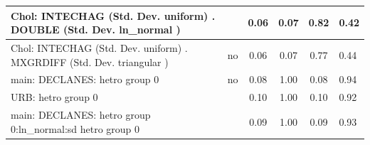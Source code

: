 \begin{table}
\begin{center}
\begin{tabular}{|l|l|c|c|c|l|}
			\hline
			 Chol: INTECHAG (Std. Dev. uniform) . DOUBLE (Std. Dev.   ln_normal ) &  & 0.06 & 0.07 & 0.82 & 0.42 \\
			\hline
			 Chol: INTECHAG (Std. Dev. uniform) . MXGRDIFF (Std. Dev.   triangular ) & no & 0.06 & 0.07 & 0.77 & 0.44 \\
			\hline
			main: DECLANES: hetro group 0 & no & 0.08 & 1.00 & 0.08 & 0.94 \\
			\hline
			URB: hetro group 0 &  & 0.10 & 1.00 & 0.10 & 0.92 \\
			\hline
			main: DECLANES: hetro group 0:ln_normal:sd  hetro group 0 &  & 0.09 & 1.00 & 0.09 & 0.93 \\
			\hline
		\end{tabular}
	\end{center}
\end{table}